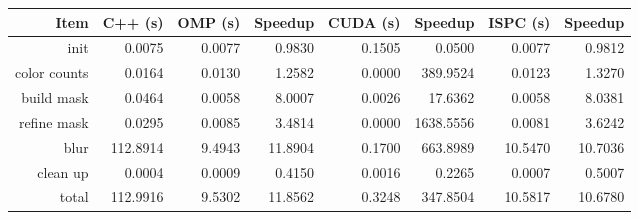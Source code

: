 \documentclass[12pt]{article}
\begin{document}
\begin{tabular}{r|r|r|r|r|r|r|r}
    Item & C++ (s) & OMP (s) & Speedup & CUDA (s) & Speedup & ISPC (s) & Speedup
\\  \hline
    init & 0.0075 & 0.0077 & 0.9830 & 0.1505 & 0.0500 & 0.0077 & 0.9812
\\  color counts & 0.0164 & 0.0130 & 1.2582 & 0.0000 & 389.9524 & 0.0123 & 1.3270
\\  build mask & 0.0464 & 0.0058 & 8.0007 & 0.0026 & 17.6362 & 0.0058 & 8.0381
\\  refine mask & 0.0295 & 0.0085 & 3.4814 & 0.0000 & 1638.5556 & 0.0081 & 3.6242
\\  blur & 112.8914 & 9.4943 & 11.8904 & 0.1700 & 663.8989 & 10.5470 & 10.7036
\\  clean up & 0.0004 & 0.0009 & 0.4150 & 0.0016 & 0.2265 & 0.0007 & 0.5007
\\  \hline
    total & 112.9916 & 9.5302 & 11.8562 & 0.3248 & 347.8504 & 10.5817 & 10.6780
\end{tabular}
\end{document}
